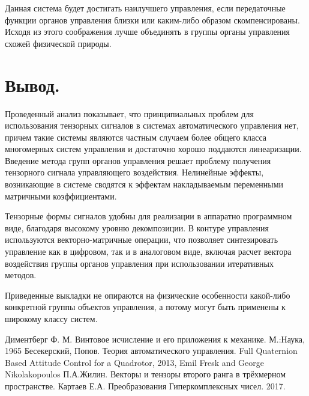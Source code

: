 \documentclass[a4paper]{article}
\begin{document}
Данная система будет достигать наилучшего управления, если передаточные функции органов управления близки или каким-либо образом скомпенсированы. Исходя из этого соображения лучше объединять в группы органы управления схожей физической природы.

\section{Вывод.}
Проведенный анализ показывает, что принципиальных проблем для использования тензорных сигналов в системах автоматического управления нет, причем такие системы являются частным случаем более общего класса многомерных систем управления и достаточно хорошо поддаются линеаризации. Введение метода групп органов управления решает проблему получения тензорного сигнала управляющего воздействия. Нелинейные эффекты, возникающие в системе сводятся к эффектам накладываемым переменными матричными коэффициентами.

Тензорные формы сигналов удобны для реализации в аппаратно программном виде, благодаря высокому уровню декомпозиции. В контуре управления используются векторно-матричные операции, что позволяет синтезировать управление как в цифровом, так и в аналоговом виде, включая расчет вектора воздействия группы органов управления при использовании итеративных методов. 

Приведенные выкладки не опираются на физические особенности какой-либо конкретной группы объектов управления, а потому могут быть применены к широкому классу систем. 



\begin{thebibliography}{9}
 Диментберг Ф. М. Винтовое исчисление и его приложения к механике. М.:Наука, 1965
 Бесекерский, Попов. Теория автоматического управления.
 Full Quaternion Based Attitude Control for a Quadrotor, 2013, Emil Fresk and George Nikolakopoulos
 П.А.Жилин. Векторы и тензоры второго ранга в трёхмерном пространстве.
 Картаев Е.А. Преобразования Гиперкомплексных чисел. 2017.

\end{thebibliography}
\end{document}
